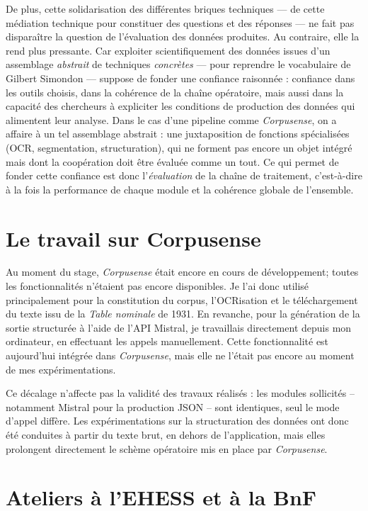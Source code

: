 De plus, cette solidarisation des différentes briques techniques — de cette médiation technique pour constituer des questions et des réponses — ne fait pas disparaître la question de l’évaluation des données produites. Au contraire, elle la rend plus pressante. Car exploiter scientifiquement des données issues d’un assemblage \emph{abstrait} de techniques \emph{concrètes} — pour reprendre le vocabulaire de Gilbert Simondon — suppose de fonder une confiance raisonnée : confiance dans les outils choisis, dans la cohérence de la chaîne opératoire, mais aussi dans la capacité des chercheurs à expliciter les conditions de production des données qui alimentent leur analyse. Dans le cas d’une pipeline comme \emph{Corpusense}, on a affaire à un tel assemblage abstrait : une juxtaposition de fonctions spécialisées (OCR, segmentation, structuration), qui ne forment pas encore un objet intégré mais dont la coopération doit être évaluée comme un tout. Ce qui permet de fonder cette confiance est donc l’\emph{évaluation} de la chaîne de traitement, c’est-à-dire à la fois la performance de chaque module et la cohérence globale de l’ensemble.

\section{Le travail sur Corpusense}

Au moment du stage, \emph{Corpusense} était encore en cours de développement; toutes les fonctionnalités n'étaient pas encore disponibles. Je l’ai donc utilisé principalement pour la constitution du corpus, l’OCRisation et le téléchargement du texte issu de la \emph{Table nominale} de 1931. En revanche, pour la génération de la sortie structurée à l’aide de l’API Mistral, je travaillais directement depuis mon ordinateur, en effectuant les appels manuellement. Cette fonctionnalité est aujourd’hui intégrée dans \emph{Corpusense}, mais elle ne l’était pas encore au moment de mes expérimentations.

Ce décalage n’affecte pas la validité des travaux réalisés : les modules sollicités -- notamment Mistral pour la production JSON -- sont identiques, seul le mode d’appel diffère. Les expérimentations sur la structuration des données ont donc été conduites à partir du texte brut, en dehors de l’application, mais elles prolongent directement le schème opératoire mis en place par \emph{Corpusense}.

\section{Ateliers à l'EHESS et à la BnF}

